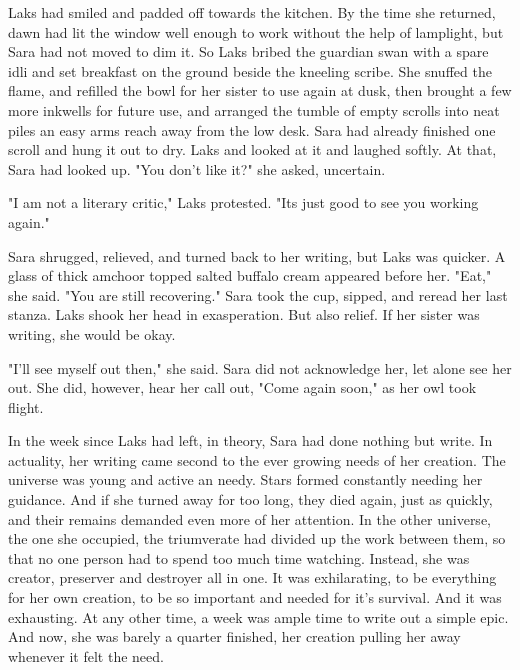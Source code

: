 \documentclass{article}
\begin{document}
Laks had smiled and padded off towards the kitchen. By the time she returned, dawn had lit the window well enough to work without the help of lamplight, but Sara had not moved to dim it. So Laks bribed the guardian swan with a spare idli and set breakfast on the ground beside the kneeling scribe. She snuffed the flame, and refilled the bowl for her sister to use again at dusk, then brought a few more inkwells for future use, and arranged the tumble of empty scrolls into neat piles an easy arms reach away from the low desk. Sara had already finished one scroll and hung it out to dry. Laks and looked at it and laughed softly. At that, Sara had looked up. "You don't like it?" she asked, uncertain.

"I am not a literary critic," Laks protested. "Its just good to see you working again."

Sara shrugged, relieved, and turned back to her writing, but Laks was quicker. A glass of thick amchoor topped salted buffalo cream appeared before her. "Eat," she said. "You are still recovering." Sara took the cup, sipped, and reread her last stanza. Laks shook her head in exasperation. But also relief. If her sister was writing, she would be okay.

"I'll see myself out then," she said. Sara did not acknowledge her, let alone see her out. She did, however, hear her call out, "Come again soon," as her owl took flight.

In the week since Laks had left, in theory, Sara had done nothing but write. In actuality, her writing came second to the ever growing needs of her creation. The universe was young and active an needy. Stars formed constantly needing her guidance. And if she turned away for too long, they died again, just as quickly, and their remains demanded even more of her attention. In the other universe, the one she occupied, the triumverate had divided up the work between them, so that no one person had to spend too much time watching. Instead, she was creator, preserver and destroyer all in one. It was exhilarating, to be everything for her own creation, to be so important and needed for it's survival. And it was exhausting. At any other time, a week was ample time to write out a simple epic. And now, she was barely a quarter finished, her creation pulling her away whenever it felt the need. 
\end{document}
